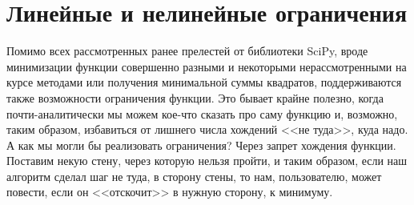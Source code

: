 \documentclass[12pt, a4paper, oneside, final]{article}
\begin{document}
	\section*{Линейные и нелинейные ограничения}
	Помимо всех рассмотренных ранее прелестей от библиотеки SciPy, вроде минимизации функции совершенно разными и некоторыми нерассмотренными на курсе методами или получения минимальной суммы квадратов, поддерживаются также возможности ограничения функции.
	Это бывает крайне полезно, когда почти-аналитически мы можем кое-что сказать про саму функцию и, возможно, таким образом, избавиться от лишнего числа хождений <<не туда>>, куда надо.
	А как мы могли бы реализовать ограничения?
	Через запрет хождения функции.
	Поставим некую стену, через которую нельзя пройти, и таким образом, если наш алгоритм сделал шаг не туда, в сторону стены, то нам, пользователю, может повести, если он <<отскочит>> в нужную сторону, к минимуму.
\end{document}
